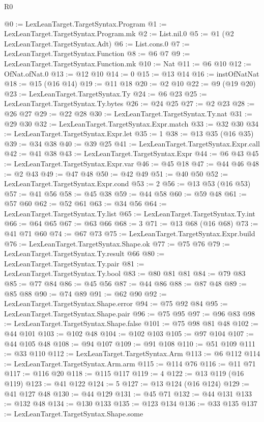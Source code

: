\begin{lexlean}{R0}
\begin{coremodule}
@0 := LexLeanTarget.TargetSyntax.Program
@1 := LexLeanTarget.TargetSyntax.Program.mk
@2 := List.nil.{0}
@5 := @1 (@2 LexLeanTarget.TargetSyntax.Adt)
@6 := List.cons.{0}
@7 := LexLeanTarget.TargetSyntax.Function
@8 := @6 @7
@9 := LexLeanTarget.TargetSyntax.Function.mk
@10 := Nat
@11 := @6 @10
@12 := OfNat.ofNat.{0}
@13 := @12 @10
@14 := 0
@15 := @13 @14
@16 := instOfNatNat
@18 := @15 (@16 @14)
@19 := @11 @18
@20 := @2 @10
@22 := @9 (@19 @20)
@23 := LexLeanTarget.TargetSyntax.Ty
@24 := @6 @23
@25 := LexLeanTarget.TargetSyntax.Ty.bytes
@26 := @24 @25
@27 := @2 @23
@28 := @26 @27
@29 := @22 @28
@30 := LexLeanTarget.TargetSyntax.Ty.nat
@31 := @29 @30
@32 := LexLeanTarget.TargetSyntax.Expr.match
@33 := @32 @30
@34 := LexLeanTarget.TargetSyntax.Expr.let
@35 := 1
@38 := @13 @35 (@16 @35)
@39 := @34 @38
@40 := @39 @25
@41 := LexLeanTarget.TargetSyntax.Expr.call
@42 := @41 @38
@43 := LexLeanTarget.TargetSyntax.Expr
@44 := @6 @43
@45 := LexLeanTarget.TargetSyntax.Expr.var
@46 := @45 @18
@47 := @44 @46
@48 := @2 @43
@49 := @47 @48
@50 := @42 @49
@51 := @40 @50
@52 := LexLeanTarget.TargetSyntax.Expr.cond
@53 := 2
@56 := @13 @53 (@16 @53)
@57 := @41 @56
@58 := @45 @38
@59 := @44 @58
@60 := @59 @48
@61 := @57 @60
@62 := @52 @61
@63 := @34 @56
@64 := LexLeanTarget.TargetSyntax.Ty.list
@65 := LexLeanTarget.TargetSyntax.Ty.int
@66 := @64 @65
@67 := @63 @66
@68 := 3
@71 := @13 @68 (@16 @68)
@73 := @41 @71 @60
@74 := @67 @73
@75 := LexLeanTarget.TargetSyntax.Expr.build
@76 := LexLeanTarget.TargetSyntax.Shape.ok
@77 := @75 @76
@79 := LexLeanTarget.TargetSyntax.Ty.result @66
@80 := LexLeanTarget.TargetSyntax.Ty.pair
@81 := LexLeanTarget.TargetSyntax.Ty.bool
@83 := @80 @81 @81
@84 := @79 @83
@85 := @77 @84
@86 := @45 @56
@87 := @44 @86
@88 := @87 @48
@89 := @85 @88
@90 := @74 @89
@91 := @62 @90
@92 := LexLeanTarget.TargetSyntax.Shape.error
@94 := @75 @92 @84
@95 := LexLeanTarget.TargetSyntax.Shape.pair
@96 := @75 @95
@97 := @96 @83
@98 := LexLeanTarget.TargetSyntax.Shape.false
@101 := @75 @98 @81 @48
@102 := @44 @101
@103 := @102 @48
@104 := @102 @103
@105 := @97 @104
@107 := @44 @105 @48
@108 := @94 @107
@109 := @91 @108
@110 := @51 @109
@111 := @33 @110
@112 := LexLeanTarget.TargetSyntax.Arm
@113 := @6 @112
@114 := LexLeanTarget.TargetSyntax.Arm.arm
@115 := @114 @76
@116 := @11 @71
@117 := @116 @20
@118 := @115 @117
@119 := 4
@122 := @13 @119 (@16 @119)
@123 := @41 @122
@124 := 5
@127 := @13 @124 (@16 @124)
@129 := @41 @127 @48
@130 := @44 @129
@131 := @45 @71
@132 := @44 @131
@133 := @132 @48
@134 := @130 @133
@135 := @123 @134
@136 := @33 @135
@137 := LexLeanTarget.TargetSyntax.Shape.some

\end{coremodule}
\end{lexlean}
